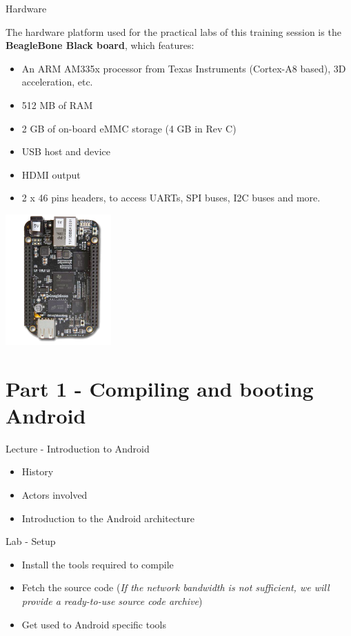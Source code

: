 \documentclass[a4paper,12pt,obeyspaces,spaces,hyphens]{article}
\begin{document}
\feagendatwocolumn
{Hardware}
{
  The hardware platform used for the practical labs of this training
  session is the {\bf BeagleBone Black board}, which features:

  \begin{itemize}
  \item An ARM AM335x processor from Texas Instruments (Cortex-A8
    based), 3D acceleration, etc.
  \item 512 MB of RAM
  \item 2 GB of on-board eMMC storage
        \newline(4 GB in Rev C)
  \item USB host and device
  \item HDMI output
  \item 2 x 46 pins headers, to access UARTs, SPI buses, I2C buses
    and more.
  \end{itemize}
}
{}
{
  \begin{center}
    \includegraphics[height=5cm]{../slides/beagleboneblack-board/beagleboneblack.png}
  \end{center}
}

\section{Part 1 - Compiling and booting Android}

\feagendatwocolumn
{Lecture - Introduction to Android}
{
  \begin{itemize}
  \item History
  \item Actors involved
  \item Introduction to the Android architecture
  \end{itemize}
}
{Lab - Setup}
{
  \begin{itemize}
  \item Install the tools required to compile
  \item Fetch the source code (\textit{If the network bandwidth is not
      sufficient, we will provide a ready-to-use source code archive})
  \item Get used to Android specific tools
  \end{itemize}
}
\end{document}
